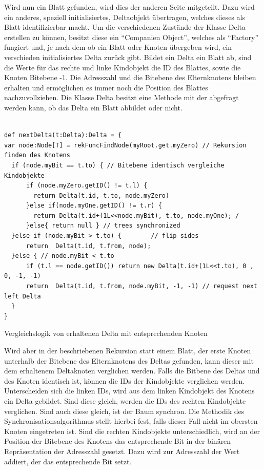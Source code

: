 \documentclass[a4paper,11pt,oneside,%
headsepline,												%
footsepline,												%
bibtotocnumbered									%
]{scrreprt}
\begin{document}
Wird nun ein Blatt gefunden, wird dies der anderen Seite mitgeteilt. Dazu wird ein anderes, speziell initialisiertes, Deltaobjekt übertragen, welches dieses als Blatt identifizierbar macht. Um die verschiedenen Zustände der Klasse Delta erstellen zu können, besitzt diese ein \enquote{Companien Object}, welches als \enquote{Factory} fungiert und, je nach dem ob ein Blatt oder Knoten übergeben wird, ein verschieden initialisiertes Delta zurück gibt. Bildet ein Delta ein Blatt ab, sind die Werte für das rechte und linke Kindobjekt die ID des Blattes, sowie die Knoten Bitebene -1. Die Adresszahl und die Bitebene des Elternknotens bleiben erhalten und ermöglichen es immer noch die Position des Blattes nachzuvollziehen. Die Klasse Delta besitzt eine Methode mit der abgefragt werden kann, ob das Delta ein Blatt abbildet oder nicht.\\\\
\begin{listing}[H]
	\begin{verbatim}
def nextDelta(t:Delta):Delta = {
var node:Node[T] = rekFuncFindNode(myRoot.get.myZero) // Rekursion finden des Knotens
  if (node.myBit == t.to) { // Bitebene identisch vergleiche Kindobjekte
      if (node.myZero.getID() != t.l) {
        return Delta(t.id, t.to, node.myZero)
      }else if(node.myOne.getID() != t.r) {
        return Delta(t.id+(1L<<node.myBit), t.to, node.myOne); /
      }else{ return null } // trees synchronized
  }else if (node.myBit > t.to) {        // flip sides
      return  Delta(t.id, t.from, node); 
  }else { // node.myBit < t.to
      if (t.l == node.getID()) return new Delta(t.id+(1L<<t.to), 0 , 0, -1, -1)
      return  Delta(t.id, t.from, node.myBit, -1, -1) // request next left Delta
  }
}
	\end{verbatim}
	\caption{Vergleichslogik von erhaltenen Delta mit entsprechenden Knoten}
	\label{lst:DeltaComp}
\end{listing}
Wird aber in der beschriebenen Rekursion statt einem Blatt, der erste Knoten unterhalb der Bitebene des Elternknotens des Deltas gefunden, kann dieser mit dem erhaltenem Deltaknoten verglichen werden. Falls die Bitbene des Deltas und des Knoten identisch ist, können die IDs der Kindobjekte verglichen werden. Unterscheiden sich die linken IDs, wird aus dem linken Kindobjekt des Knotens ein Delta gebildet. Sind diese gleich, werden die IDs des rechten Kindobjekte verglichen. Sind auch diese gleich, ist der Baum synchron. Die Methodik des Synchronisationsalgorithmus stellt hierbei fest, falls dieser Fall nicht im obersten Knoten eingetreten ist. Sind die rechten Kindobjekte unterschiedlich, wird an der Position der Bitebene des Knotens das entsprechende Bit in der binären Repräsentation der Adresszahl gesetzt. Dazu wird zur Adresszahl der Wert addiert, der das entsprechende Bit setzt.\\
\end{document}

